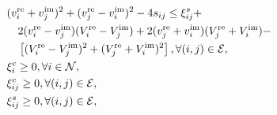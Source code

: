 \documentclass[11pt,twoside]{article}
\begin{document}
\begin{subequations}
\begin{align}
		& (v_i^{\text{re}} + v_j^{\text{im}})^2 + (v_j^{\text{re}} - v_i^{\text{im}})^2 - 4s_{ij} \leq \xi_{ij}^s + \notag \\
		& \quad 2(v_i^{\text{re}} - v_j^{\text{im}})(V_i^{\text{re}} - V_j^{\text{im}}) + 2(v_j^{\text{re}} + v_i^{\text{im}})(V_j^{\text{re}} + V_i^{\text{im}}) - \notag \\
		& \quad \left[ (V_i^{\text{re}} - V_j^{\text{im}})^2 + (V_j^{\text{re}} + V_i^{\text{im}})^2 \right], \forall (i, j) \in \mathcal{E},  \\
		& \xi_i^c \geq 0, \forall i \in \mathcal{N},\\
		& \xi_{ij}^c \geq 0, \forall (i, j) \in \mathcal{E},  \\
		& \xi_{ij}^s \geq 0, \forall (i, j) \in \mathcal{E},
	\end{align}
\end{subequations}
\end{document}

